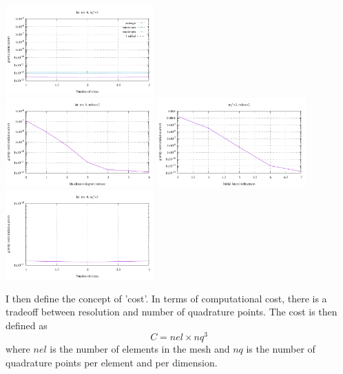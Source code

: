 \begin{center}
\includegraphics[width=5.7cm]{./images/benchmark_gravity/bench1/grav_nslice_error}\\
\includegraphics[width=5.7cm]{./images/benchmark_gravity/bench1/grav_nqplus_relerror}
\includegraphics[width=5.7cm]{./images/benchmark_gravity/bench1/grav_latres_relerror}
\includegraphics[width=5.7cm]{./images/benchmark_gravity/bench1/grav_nslice_relerror}\\
\end{center}

I then define the concept of 'cost'. In terms of computational cost, there is a tradeoff between resolution and 
number of quadrature points. The cost is then defined as 
\[
C = nel \times nq^3
\]
where $nel$ is the number of elements in the mesh and $nq$ is the number of quadrature points per element
and per dimension.


